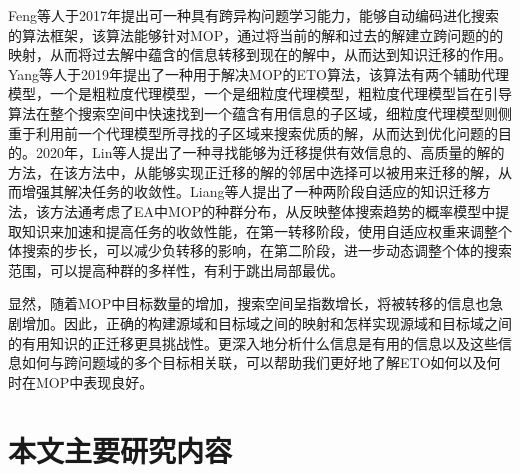 \par
Feng等人于2017年提出可一种具有跨异构问题学习能力，能够自动编码进化搜索的算法框架\cite{feng2017autoencoding}，该算法能够针对MOP，通过将当前的解和过去的解建立跨问题的的映射，从而将过去解中蕴含的信息转移到现在的解中，从而达到知识迁移的作用。Yang等人于2019年提出了一种用于解决MOP的ETO算法\cite{yang2019offline}，该算法有两个辅助代理模型，一个是粗粒度代理模型，一个是细粒度代理模型，粗粒度代理模型旨在引导算法在整个搜索空间中快速找到一个蕴含有用信息的子区域，细粒度代理模型则侧重于利用前一个代理模型所寻找的子区域来搜索优质的解，从而达到优化问题的目的。2020年，Lin等人提出了一种寻找能够为迁移提供有效信息的、高质量的解的方法\cite{lin2020effective}，在该方法中，从能够实现正迁移的解的邻居中选择可以被用来迁移的解，从而增强其解决任务的收敛性。Liang等人提出了一种两阶段自适应的知识迁移方法\cite{liang2020two}，该方法通考虑了EA中MOP的种群分布，从反映整体搜索趋势的概率模型中提取知识来加速和提高任务的收敛性能，在第一转移阶段，使用自适应权重来调整个体搜索的步长，可以减少负转移的影响，在第二阶段，进一步动态调整个体的搜索范围，可以提高种群的多样性，有利于跳出局部最优。
\par
显然，随着MOP中目标数量的增加，搜索空间呈指数增长，将被转移的信息也急剧增加\cite{tan2021evolutionary}。因此，正确的构建源域和目标域之间的映射和怎样实现源域和目标域之间的有用知识的正迁移更具挑战性。更深入地分析什么信息是有用的信息以及这些信息如何与跨问题域的多个目标相关联，可以帮助我们更好地了解ETO如何以及何时在MOP中表现良好。

\section{本文主要研究内容}

